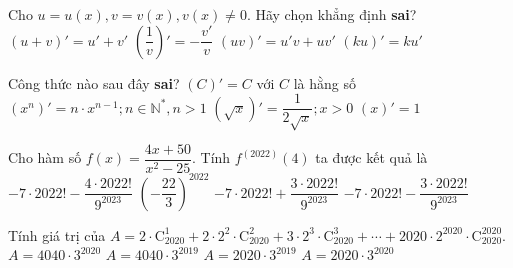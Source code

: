 \begin{ex}%
	Cho $ u=u(x), v=v(x), v(x)\ne 0 $.  Hãy chọn khẳng định \textbf{sai}?
	\choice 
		 {$(u+v)'=u'+v'$}
		 {\True $\left(\dfrac{1}{v}\right)'=-\dfrac{v'}{v}$}
		 {$(uv)'=u'v+uv'$}
		{$(ku)'=ku'$} 
\end{ex}

\begin{ex}%
	Công thức nào  sau đây \textbf{sai}?
	 \choice
		{\True $(C)'=C$ với  $C$ là hằng số}
		 {$\left(x^n\right)'=n\cdot x^{n-1}; n\in\mathbb{N}^*, n>1$}
		{$\left(\sqrt{x}\right)'=\dfrac{1}{2\sqrt{x}};  x>0$}
		{$(x)'=1$} 
\end{ex}

\begin{ex}%
	Cho hàm  số $f(x)=\dfrac{4x+50}{x^2-25}$. Tính $f^{(2022)}(4)$ ta được kết quả là
	\choice 
		 {$-7\cdot 2022!-\dfrac{4\cdot 2022!}{9^{2023}}$}
		{$\left(-\dfrac{22}{3}\right)^{2022}$} 
		{$-7\cdot 2022!+\dfrac{3\cdot 2022!}{9^{2023}}$} 
		{\True $-7\cdot  2022!-\dfrac{3\cdot 2022!}{9^{2023}}$}
\end{ex}

\begin{ex}%
	Tính giá trị của 
	$A=2 \cdot \mathrm{C}_{2020}^1+2\cdot 2^2\cdot \mathrm{C}_{2020}^2+3\cdot 2^3\cdot \mathrm{C}_{2020}^3+\cdots+2020\cdot 2^{2020}\cdot  \mathrm{C}_{2020}^{2020}$.
	 \choice
		 {$A=4040\cdot 3^{2020}$}
		{\True  $A=4040\cdot 3^{2019}$}
		 {$A=2020\cdot 3^{2019}$}
		{$A=2020\cdot  3^{2020}$}
\end{ex}

